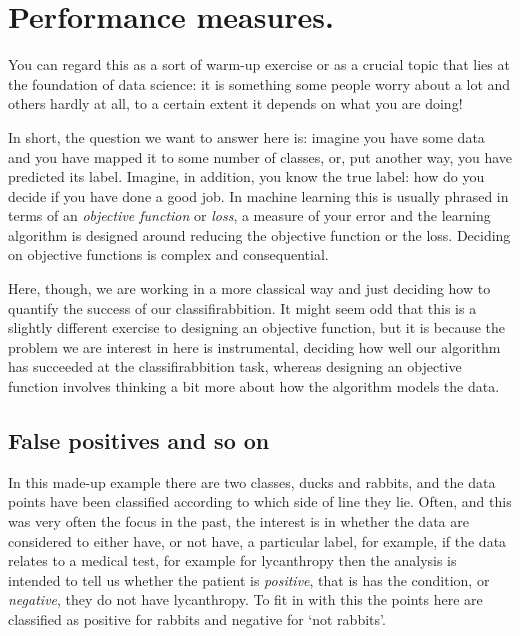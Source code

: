 \documentclass[12pt]{article}
\begin{document}
\section*{Performance measures.} 

You can regard this as a sort of warm-up exercise or as a crucial
topic that lies at the foundation of data science: it is something
some people worry about a lot and others hardly at all, to a certain
extent it depends on what you are doing!

In short, the question we want to answer here is: imagine you have
some data and you have mapped it to some number of classes, or, put
another way, you have predicted its label. Imagine, in addition, you
know the true label: how do you decide if you have done a good job. In
machine learning this is usually phrased in terms of an
\textsl{objective function} or \textsl{loss}, a measure of your error
and the learning algorithm is designed around reducing the objective
function or the loss. Deciding on objective functions is complex and
consequential.

Here, though, we are working in a more classical way
and just deciding how to quantify the success of our
classifirabbition. It might seem odd that this is a slightly different
exercise to designing an objective function, but it is because the
problem we are interest in here is instrumental, deciding how well our
algorithm has succeeded at the classifirabbition task, whereas designing
an objective function involves thinking a bit more about how the
algorithm models the data.


\subsection*{False positives and so on}

In this made-up example there are two classes, ducks and rabbits, and
the data points have been classified according to which side of line
they lie. Often, and this was very often the focus in the past, the
interest is in whether the data are considered to either have, or not
have, a particular label, for example, if the data relates to a
medical test, for example for lycanthropy then the analysis is
intended to tell us whether the patient is \textsl{positive}, that is
has the condition, or \textsl{negative}, they do not have
lycanthropy. To fit in with this the points here are classified as
positive for rabbits and negative for `not rabbits'.
\end{document}
